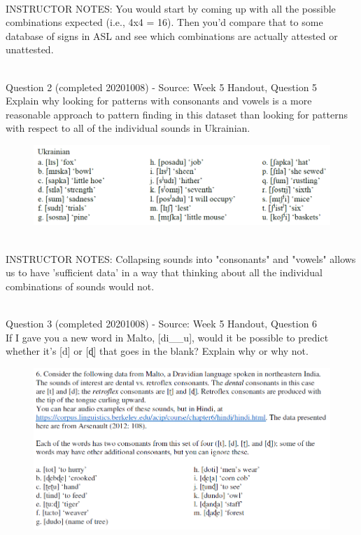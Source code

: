 \documentclass[12pt]{article}
\begin{document}
~\\
INSTRUCTOR NOTES: You would start by coming up with all the possible combinations expected (i.e., 4x4 = 16). Then you'd compare that to some database of signs in ASL and see which combinations are actually attested or unattested.


~\\

{\large Question 2} (completed 20201008) - Source: Week 5 Handout, Question 5\\

Explain why looking for patterns with consonants and vowels is a more reasonable approach to pattern finding in this dataset than looking for patterns with respect to all of the individual sounds in Ukrainian.\\

\begin{figure}[H]
\includegraphics{../images/ukrainian.png}
\end{figure}

~\\
INSTRUCTOR NOTES: Collapsing sounds into "consonants" and "vowels" allows us to have 'sufficient data' in a way that thinking about all the individual combinations of sounds would not.


~\\

{\large Question 3} (completed 20201008) - Source: Week 5 Handout, Question 6\\

If I gave you a new word in Malto, [di\_\_u], would it be possible to predict whether it's [d] or [ɖ] that goes in the blank? Explain why or why not.\\

\begin{figure}[H]
\includegraphics{../images/malto.png}
\end{figure}
\end{document}
